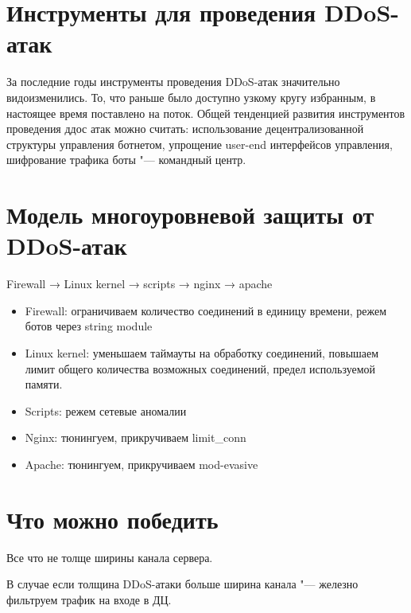 \documentclass[10pt, a5paper]{article}
\begin{document}
\section*{Инструменты для проведения DDoS-атак}
За последние годы инструменты проведения DDoS-атак значительно видоизменились. То, что раньше было доступно узкому кругу избранным, в настоящее время поставлено на поток. Общей  тенденцией развития инструментов проведения ддос атак можно считать: использование децентрализованной структуры управления ботнетом, упрощение user-end интерфейсов управления, шифрование трафика боты "--- командный центр.

\section*{Модель многоуровневой защиты от DDoS-атак}
Firewall → Linux kernel → scripts → nginx → apache
\begin{itemize}
\item Firewall: ограничиваем количество соединений в единицу времени, режем ботов через  string module
\item Linux kernel: уменьшаем таймауты на обработку соединений, повышаем лимит общего количества возможных соединений, предел используемой памяти.
\item Scripts: режем сетевые аномалии
\item Nginx: тюнингуем, прикручиваем  limit\_conn
\item Apache: тюнингуем, прикручиваем mod-evasive
\end{itemize}

\section*{Что можно победить}
Все что не толще ширины канала сервера.

В случае если толщина DDoS-атаки больше ширина канала "--- железно фильтруем трафик на входе в ДЦ.
\end{document}
